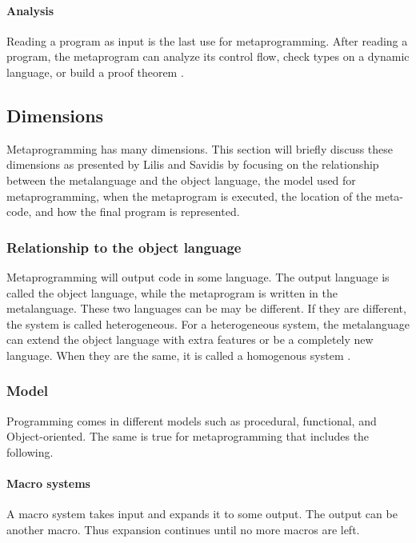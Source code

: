 \paragraph{Analysis}
Reading a program as input is the last use for metaprogramming.
After reading a program, the metaprogram can analyze its control flow, check types on a dynamic language, or build a proof theorem \cite{sheard_01_01}.

\subsection{Dimensions}
Metaprogramming has many dimensions.
This section will briefly discuss these dimensions as presented by Lilis and Savidis \cite{savidis_19_01} by focusing on the relationship between the metalanguage and the object language, the model used for metaprogramming, when the metaprogram is executed, the location of the meta-code, and how the final program is represented.

\subsubsection{Relationship to the object language}
Metaprogramming will output code in some language.
The output language is called the object language, while the metaprogram is written in the metalanguage.
These two languages can be may be different.
If they are different, the system is called heterogeneous.
For a heterogeneous system, the metalanguage can extend the object language with extra features or be a completely new language.
When they are the same, it is called a homogenous system \cite{sheard_01_01}.


\subsubsection{Model}
Programming comes in different models such as procedural, functional, and Object-oriented.
The same is true for metaprogramming that includes the following.

\paragraph{Macro systems}
A macro system takes input and expands it to some output.
The output can be another macro.
Thus expansion continues until no more macros are left.

